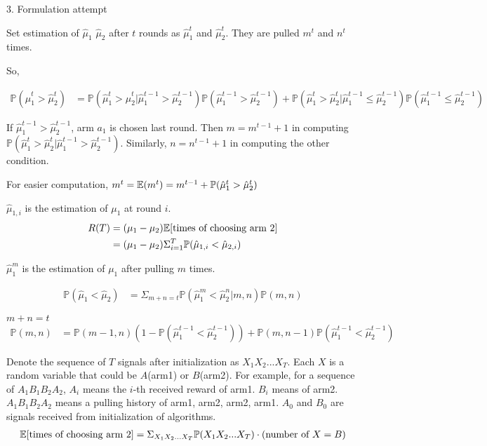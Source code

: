 \documentclass[fleqn]{article}
\def\PP{{\mathbb P}}\def\QQ{{\mathbb Q}}\def\RR{{\mathbb R}}
\begin{document}
\bigskip

3. Formulation attempt
\medskip

Set estimation of $\hat{\mu}_1$ $\hat{\mu}_2$ after $t$ rounds as $\hat{\mu}_1^t$ and $\hat{\mu}_2^t$. They are pulled $m^t$ and $n^t$ times.

So, 

\begin{align*}
\PP(\hat{\mu}_1^t>\hat{\mu}_2^t) &= \PP(\hat{\mu}_1^t>\hat{\mu}_2^t|\hat{\mu}_1^{t-1}>\hat{\mu}_2^{t-1})\PP(\hat{\mu}_1^{t-1}>\hat{\mu}_2^{t-1})+\PP(\hat{\mu}_1^t>\hat{\mu}_2^t|\hat{\mu}_1^{t-1}\leq\hat{\mu}_2^{t-1})\PP(\hat{\mu}_1^{t-1}\leq\hat{\mu}_2^{t-1})
\end{align*}

If $\hat{\mu}_1^{t-1}>\hat{\mu}_2^{t-1}$, arm $a_1$ is chosen last round. Then $m=m^{t-1}+1$ in computing $\PP(\hat{\mu}_1^t>\hat{\mu}_2^t|\hat{\mu}_1^{t-1}>\hat{\mu}_2^{t-1})$. Similarly, $n=n^{t-1}+1$ in computing the other condition.

For easier computation, $m^{t}=\EE(m^{t})=m^{t-1}+\PP(\hat{\mu}_1^{t}>\hat{\mu}_2^{t})$
\clearpage





$\hat{\mu}_{1,i}$ is the estimation of $\mu_1$ at round $i$.
\begin{align*}
R(T)&=(\mu_1-\mu_2)\EE[\text{times of choosing arm 2}]\\
&=(\mu_1-\mu_2)\Sigma_{i=1}^T{\PP(\hat{\mu}_{1,i}<\hat{\mu}_{2,i})}
\end{align*}

$\hat{\mu}_{1}^m$ is the estimation of $\mu_1$ after pulling $m$ times.

\begin{align*}
    \PP(\hat{\mu}_1<\hat{\mu}_2) &= \Sigma_{m+n=t}\PP(\hat{\mu}_1^m<\hat{\mu}_2^n|m,n)\PP(m,n)
\end{align*}

$m+n=t$
\begin{align*}
    \PP(m,n) &= \PP(m-1, n)(1-\PP(\hat{\mu}_1^{t-1}<\hat{\mu}_2^{t-1})) + \PP(m, n-1)\PP(\hat{\mu}_1^{t-1}<\hat{\mu}_2^{t-1})
\end{align*}
\bigskip

Denote the sequence of $T$ signals after initialization as $X_1X_2...X_T$. Each $X$ is a random variable that could be $A$(arm1) or $B$(arm2). For example, for a sequence of $A_1B_1B_2A_2$,  $A_i$ means the $i$-th received reward of arm1. $B_i$ means of arm2. $A_1B_1B_2A_2$ means a pulling history of arm1, arm2, arm2, arm1. $A_0$ and $B_0$ are signals received from initialization of algorithms.
\begin{align*}
    \EE[\text{times of choosing arm 2}]=\Sigma_{X_1X_2...X_T}{\PP(X_1X_2...X_T)\cdot(\text{number of }X=B)}
\end{align*}
\end{document}
